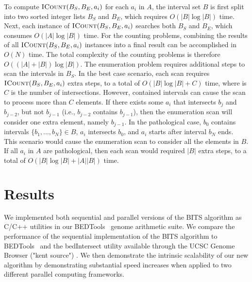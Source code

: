 \documentclass{bioinfo}
\begin{document}
	To compute $\textsc{ICount}(B_S,B_E,a_i)$ for each $a_i$ in $A$, the interval
	set $B$ is first split into two sorted integer lists $B_S$ and $B_E$,
	which requires $O(|B| \log |B|)$ time.  Next, each instance of
	$\textsc{ICount}(B_S,B_E,a_i)$ searches both $B_S$ and $B_E$, which consumes
	$O(|A| \log |B|)$ time.  For the counting problems, combining the
	results of all $\textsc{ICount}(B_S,B_E,a_i)$ instances into a final result can
	be accomplished in $O(N)$ time.  The total complexity of the counting
	problems is therefore $O((|A| + |B|) \log |B|)$.
	The enumeration problem requires additional steps to scan the
	intervals in $B_S$.  In the best case scenario, each scan requires
	$\textsc{ICount}(B_S,B_E,a_i)$ extra steps, to a total of $O(|B| \log |B|
	+ C)$ time, where is $C$ is the number of intersections.
	However,
	contained intervals can cause the scan to process more than $C$
	elements.  If there exists some $a_i$ that intersects $b_{j}$ and
	$b_{j-2}$, but not $b_{j-1}$ (i.e., $b_{j-2}$ contains $b_{j-1}$),
	then the enumeration scan will consider one extra element, namely
	$b_{j-1}$.  In the pathological case, $b_0$ contains intervals $\{b_1,
	\dots, b_N\} \in B$, $a_i$ intersects $b_0$, and $a_i$ starts after
	interval $b_N$ ends.  This scenario would cause the enumeration scan
	to consider all the elements in $B$.  If all $a_i$ in $A$ are
	pathological, then each scan would required $|B|$ extra steps, to a
	total of $O(|B| \log |B| + |A||B|)$ time.



	\section{Results}
	We implemented both sequential and parallel versions of 
	the BITS algorithm as C/C++ utilities in our BEDTools~\citep{quinlan2010} 
	genome arithmetic suite. We compare the performance of the sequential 
	implementation of the BITS algorithm to BEDTools~\citep{quinlan2010} 
	and the bedIntersect utility available through the UCSC Genome Browser ("kent source") \citep{kent2002}.
	We then demonstrate the intrinsic scalability of our new algorithm by demonstrating
	substantial speed increases when applied to two different parallel computing frameworks.
	
\end{document}

